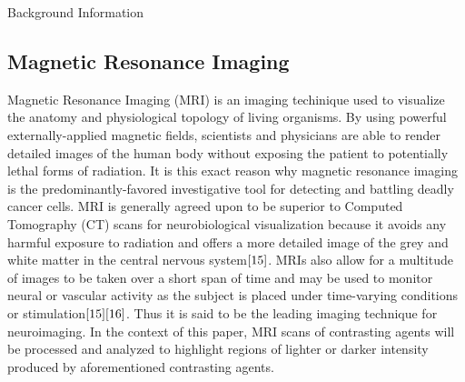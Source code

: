 \documentclass[a4paper,12pt]{article}
\begin{document}
\begin{section}{Background Information}

\subsection{Magnetic Resonance Imaging}
Magnetic Resonance Imaging (MRI) is an imaging techinique used to visualize the anatomy and physiological topology of living organisms. By using powerful externally-applied magnetic fields, scientists and physicians are able to render detailed images of the human body without exposing the patient to potentially lethal forms of radiation. It is this exact reason why magnetic resonance imaging is the predominantly-favored investigative tool for detecting and battling deadly cancer cells. MRI is generally agreed upon to be superior to Computed Tomography (CT) scans for neurobiological visualization because it avoids any harmful exposure to radiation and offers a more detailed image of the grey and white matter in the central nervous system$\cite{15}$.
MRIs also allow for a multitude of images to be taken over a short span of time and may be used to monitor neural or vascular activity as the subject is placed under time-varying conditions or stimulation$\cite{15}\cite{16}$.
Thus it is said to be the leading imaging technique for neuroimaging. In the context of this paper, MRI scans of contrasting agents will be processed and analyzed to highlight regions of lighter or darker intensity produced by aforementioned contrasting agents. 


\end{section}
\end{document}
